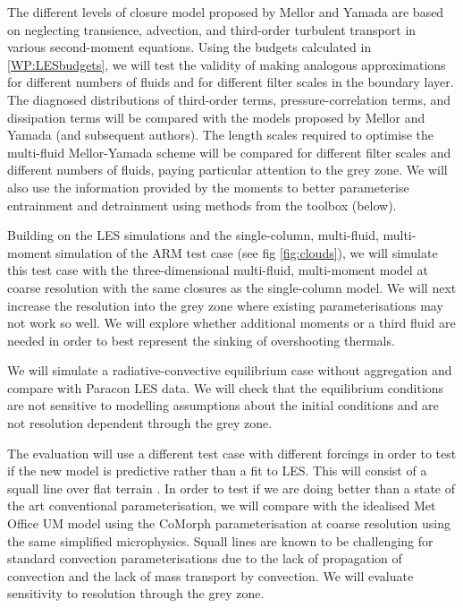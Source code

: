 \documentclass[11pt,a4paper]{article}
\begin{document}

The different levels of closure model proposed by Mellor and Yamada are based on neglecting transience, advection, and third-order turbulent transport in various second-moment equations. Using the budgets calculated in \ref{WP:LESbudgets}, we will test the validity of making analogous approximations for different numbers of fluids and for different filter scales in the boundary layer. The diagnosed distributions of third-order terms, pressure-correlation terms, and dissipation terms will be compared with the models proposed by Mellor and Yamada (and subsequent authors). The length scales required to optimise the multi-fluid Mellor-Yamada scheme will be compared for different filter scales and different numbers of fluids, paying particular attention to the grey zone. We will also use the information provided by the moments to better parameterise entrainment and detrainment using methods from the toolbox (below).


Building on the LES simulations and the single-column, multi-fluid, multi-moment simulation of the ARM test case (see fig \ref{fig:clouds}), we will simulate this test case with the three-dimensional multi-fluid, multi-moment model at coarse resolution with the same closures as the single-column model.  We will next increase the resolution into the grey zone where existing parameterisations may not work so well. We will explore whether additional moments or a third fluid are needed in order to best represent the sinking of overshooting thermals. 

We will simulate a radiative-convective equilibrium case without aggregation and compare with Paracon LES data. We will check that the equilibrium conditions are not sensitive to modelling assumptions about the initial conditions and are not resolution dependent through the grey zone.



The evaluation will use a different test case with different forcings in order to test if the new model is predictive rather than a fit to LES. This will consist of a squall line over flat terrain \cite[]{FM06}. In order to test if we are doing better than a state of the art conventional parameterisation, we will compare with the idealised Met Office UM model using the CoMorph parameterisation at coarse resolution using the same simplified microphysics. Squall lines are known to be challenging for standard convection parameterisations \cite[e.g.][]{LCD+08} due to the lack of propagation of convection and the lack of mass transport by convection. We will evaluate sensitivity to resolution through the grey zone. 
\end{document}
